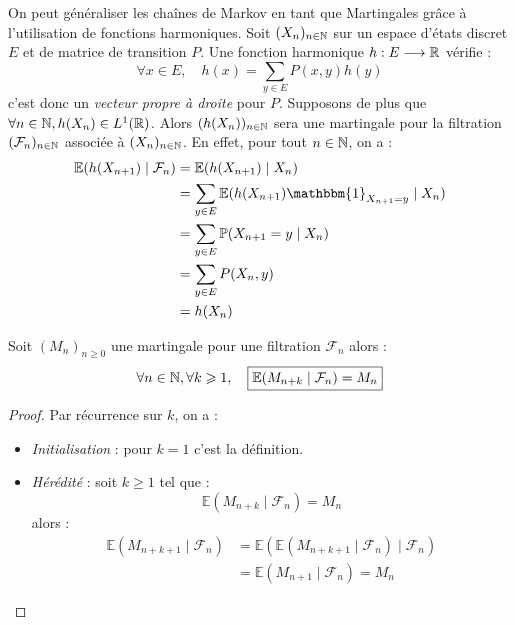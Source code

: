 \begin{example}
    On peut généraliser les chaînes de Markov en tant que Martingales grâce à l'utilisation de fonctions harmoniques. 
    Soit $(X_n)_{n \in \mathbb{N}}$ sur un espace d'états discret $E$ et de matrice de transition $P$. Une fonction 
    harmonique $h : E \longrightarrow \mathbb{R}$ vérifie : 
        $$ \forall x \in E, \quad h(x) = \sum_{y \in E} P(x,y)h(y) $$ 
    c'est donc un \emph{vecteur propre à droite} pour $P$. Supposons de plus que $ \forall n \in \mathbb{N}, h(X_n) \in L^1(\mathbb{R})$. 
    Alors $(h(X_n))_{n \in \mathbb{N}}$ sera une martingale pour la filtration $( \mathcal{F}_n)_{n \in \mathbb{N}}$ associée à $(X_n)_{n \in \mathbb{N}}$. 
    En effet, pour tout $ n \in \mathbb{N}$, on a : 
        \begin{align*}
            \mathbb{E}(h(X_{n+1}) \mid \mathcal{F}_n) &= \mathbb{E}(h(X_{n+1}) \mid X_n) \\ 
            &= \sum_{y \in E} \mathbb{E}(h(X_{n+1}) \mathbbm{1}_{X_{n+1} = y} \mid X_n ) \\ 
            &= \sum_{y \in E} \myP(X_{n+1} = y \mid X_n) \\ 
            &= \sum_{y \in E} P(X_n,y) \\ 
            &= h(X_n)
        \end{align*}
\end{example}

\begin{proposition}
    Soit $(M_n)_{n \geqslant 0}$ une martingale pour une filtration $ \mathcal{F}_n$ alors : 
        \begin{equation}\label{proposition:generalisation-definition}
            \forall n \in \mathbb{N}, \forall k \geqslant 1, \quad \boxed{ \mathbb{E}(M_{n +k} \mid \mathcal{F}_n) = M_n}
        \end{equation}
\end{proposition}

\begin{proof}
    Par récurrence sur $k$, on a :
    \begin{itemize}
        \item \emph{Initialisation} : pour $k = 1$ c'est la définition. 
        \item \emph{Hérédité} : soit $k \geqslant 1$ tel que : 
            $$ \mathbb{E}(M_{n+k} \mid \mathcal{F}_n) = M_n$$ 
        alors : 
            \begin{align*}
                \mathbb{E}(M_{n + k + 1} \mid \mathcal{F}_n) &= \mathbb{E}( \mathbb{E}(M_{n+k+1} \mid \mathcal{F}_n) \mid \mathcal{F}_n) \\ 
                &= \mathbb{E}(M_{n+1} \mid \mathcal{F}_n) = M_n 
            \end{align*}
    \end{itemize}
\end{proof}


